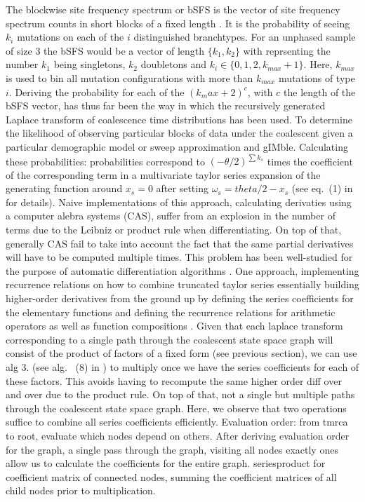 \documentclass[10pt, a4]{article}
\begin{document}
The blockwise site frequency spectrum or bSFS is the vector of site frequency spectrum counts in short blocks of a fixed length \citep{Bunnefeld2015}. It is the probability of seeing $k_i$ mutations on each of the $i$ distinguished branchtypes. 
For an unphased sample of size 3 the bSFS would be a vector of length $\{k_1, k_2\}$ with reprsenting the number $k_1$ being singletons, $k_2$ doubletons and $k_i \in \{0, 1, 2, k_{max} + 1\}$. Here, $k_{max}$ is used to bin all mutation configurations with more than $k_{max}$ mutations of type $i$. 
Deriving the probability for each of the $(k_max + 2)^c$, with $c$ the length of the bSFS vector, has thus far been the way in which the recursively generated Laplace transform of coalescence time distributions has been used. To determine the likelihood of observing particular blocks of data under the coalescent given a particular demographic model or sweep approximation \citep{Lohse2011, Bunnefeld2015, Lohse2016, Bisschop2021} and gIMble. Calculating these probabilities: probabilities correspond to $(-\theta/2)^{\sum k_s}$ times the coefficient of the corresponding term in a multivariate taylor series expansion of the generating function around $x_s=0$ after setting $\omega_s = theta/2 - x_s$ (see eq.\ (1) in \citet{Lohse2011} for details). Naive implementations of this approach, calculating derivaties using a computer alebra systems (CAS), suffer from an explosion in the number of terms due to the Leibniz or product rule when differentiating. On top of that, generally CAS fail to take into account the fact that the same partial derivatives will have to be computed multiple times. This problem has been well-studied for the purpose of automatic differentiation algorithms \citep{Neidinger1992, Neidinger1995, Griewank2000, Bettencourt2019}. One approach, implementing recurrence relations on how to combine truncated taylor series essentially building higher-order derivatives from the ground up by defining the series coefficients for the elementary functions and defining the recurrence relations for arithmetic operators as well as function compositions \citep{Neidinger2013}. Given that each laplace transform corresponding to a single path through the coalescent state space graph will consist of the product of factors of a fixed form (see previous section), we can use alg 3. (see alg. \ (8) in \citet{Neidinger2013}) to multiply once we have the series coefficients for each of these factors. This avoids having to recompute the same higher order diff over and over due to the product rule. On top of that, not a single but multiple paths through the coalescent state space graph. Here, we observe that two operations suffice to combine all series coefficients efficiently.
Evaluation order: from tmrca to root, evaluate which nodes depend on others.
After deriving evaluation order for the graph, a single pass through the graph, visiting all nodes exactly ones allow us to calculate the coefficients for the entire graph. seriesproduct for coefficient matrix of connected nodes, summing the coefficient matrices of all child nodes prior to multiplication.
\end{document}
